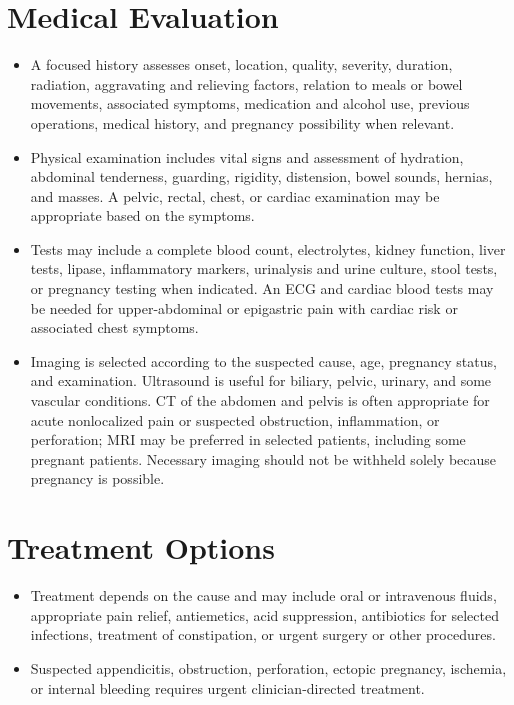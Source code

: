 \section*{Medical Evaluation}
\begin{itemize}
 \item A focused history assesses onset, location, quality, severity, duration, radiation, aggravating and relieving factors, relation to meals or bowel movements, associated symptoms, medication and alcohol use, previous operations, medical history, and pregnancy possibility when relevant.
 \item Physical examination includes vital signs and assessment of hydration, abdominal tenderness, guarding, rigidity, distension, bowel sounds, hernias, and masses. A pelvic, rectal, chest, or cardiac examination may be appropriate based on the symptoms.
 \item Tests may include a complete blood count, electrolytes, kidney function, liver tests, lipase, inflammatory markers, urinalysis and urine culture, stool tests, or pregnancy testing when indicated. An ECG and cardiac blood tests may be needed for upper-abdominal or epigastric pain with cardiac risk or associated chest symptoms.
 \item Imaging is selected according to the suspected cause, age, pregnancy status, and examination. Ultrasound is useful for biliary, pelvic, urinary, and some vascular conditions. CT of the abdomen and pelvis is often appropriate for acute nonlocalized pain or suspected obstruction, inflammation, or perforation; MRI may be preferred in selected patients, including some pregnant patients. Necessary imaging should not be withheld solely because pregnancy is possible.
\end{itemize}

\section*{Treatment Options}
\begin{itemize}
 \item Treatment depends on the cause and may include oral or intravenous fluids, appropriate pain relief, antiemetics, acid suppression, antibiotics for selected infections, treatment of constipation, or urgent surgery or other procedures.
 \item Suspected appendicitis, obstruction, perforation, ectopic pregnancy, ischemia, or internal bleeding requires urgent clinician-directed treatment.
\end{itemize}

